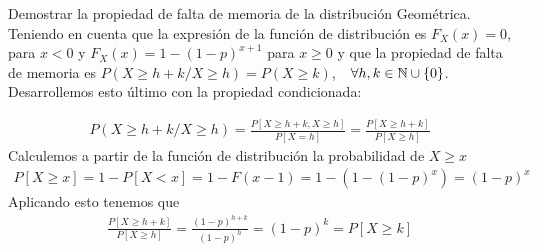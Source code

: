 \begin{ejercicio}
    Demostrar la propiedad de falta de memoria de la distribución Geométrica.\\
    
    Teniendo en cuenta que la expresión de la función de distribución es $F_X(x)=0$, para $x<0$ y $F_X(x)=1-(1-p)^{x+1}$ para $x\geq 0$ y que la propiedad de falta de memoria es $P(X\geq h+k/X\geq h) = P(X\geq k)$,\ \ $\forall h,k \in \mathbb{N}\cup \{0\}$. Desarrollemos esto último con la propiedad condicionada:

    \begin{gather*}
        P(X\geq h+k/X\geq h) = \frac{P[X\geq h+k, X \geq h]}{P[X=h]} = \frac{P[X\geq h+k]}{P[X \geq h]}
    \end{gather*}
    Calculemos a partir de la función de distribución la probabilidad de $X\geq x$
    \begin{gather*}
        P[X\geq x] = 1-P[X<x] = 1-F(x-1) = 1-(1-(1-p)^x) = (1-p)^x
    \end{gather*}
    Aplicando esto tenemos que 
    \begin{gather*}
        \frac{P[X\geq h+k]}{P[X \geq h]} = \frac{(1-p)^{h+k}}{(1-p)^h} = (1-p)^k=P[X\geq k]
    \end{gather*}

\end{ejercicio}

